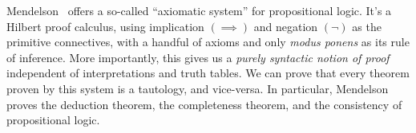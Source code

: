 \begin{node}\label{prop-000F}%
Mendelson~\cite[\S1.4]{mendelson2015mathematical} offers a so-called
``axiomatic system'' for propositional logic. It's a Hilbert proof
calculus, using implication $(\implies)$ and negation $(\neg)$ as the
primitive connectives, with a handful of axioms and only
\textit{modus ponens} as its rule of inference. More importantly, this
gives us a \emph{purely syntactic notion of proof} independent of
interpretations and truth tables. We can prove that every theorem proven
by this system is a tautology, and vice-versa. In particular, Mendelson
proves the deduction theorem, the completeness theorem, and the consistency of
propositional logic.
\end{node}
